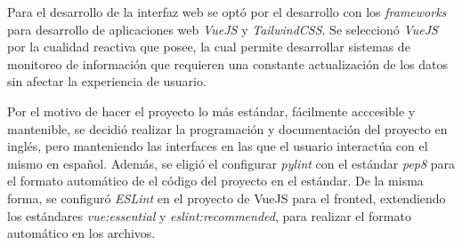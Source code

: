 Para el desarrollo de la interfaz web se optó por el desarrollo con los \textit{frameworks} para desarrollo de aplicaciones web \textit{VueJS} y \textit{TailwindCSS}. Se seleccionó \textit{VueJS} por la cualidad reactiva que posee, la cual permite desarrollar sistemas de monitoreo de información que requieren una constante actualización de los datos sin afectar la experiencia de usuario.

Por el motivo de hacer el proyecto lo más estándar, fácilmente acccesible y mantenible, se decidió realizar la programación y documentación del proyecto en inglés, pero manteniendo las interfaces en las que el usuario interactúa con el mismo en español. Además, se eligió el configurar \textit{pylint} con el estándar \textit{pep8} para el formato automático de el código del proyecto en el estándar. De la misma forma, se configuró \textit{ESLint} en el proyecto de VueJS para el fronted, extendiendo los estándares \textit{vue:essential} y \textit{eslint:recommended}, para realizar el formato automático en los archivos.
